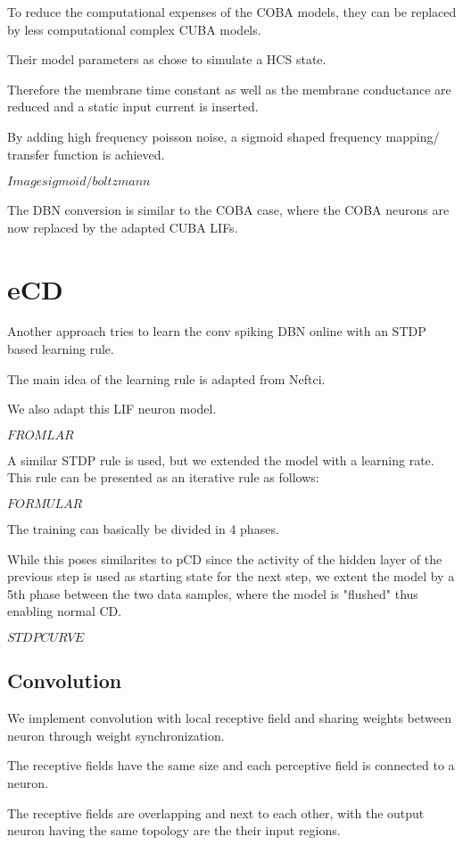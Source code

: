 To reduce the computational expenses of the COBA models, they can be replaced by less computational complex CUBA models.

Their model parameters as chose to simulate a HCS state.

Therefore the membrane time constant as well as the membrane conductance are reduced and a static input current is inserted.  

By adding high frequency poisson noise, a sigmoid shaped frequency mapping/ transfer function is achieved.

$Image sigmoid/ boltzmann$

The DBN conversion is similar to the COBA case, where the COBA neurons are now replaced by the adapted CUBA LIFs.

\section{eCD}

Another approach tries to learn the conv spiking DBN online with an STDP based learning rule. 

The main idea of the learning rule is adapted from Neftci.

We also adapt this LIF neuron model.

$FROMLAR$

A similar STDP rule is used, but we extended the model with a learning rate. 
This rule can be presented as an iterative rule as follows:

$FORMULAR$

The training can basically be divided in 4 phases. 

While this poses similarites to pCD since the activity of the hidden layer of the previous step is used as starting state for the next step, we extent the model by a 5th phase between the two data samples, where the model is "flushed" thus enabling normal CD.

$STDP CURVE$

\subsection{Convolution}

We implement convolution with local receptive field and sharing weights between neuron through weight synchronization.

The receptive fields have the same size and each perceptive field is connected to a neuron. 

The receptive fields are overlapping and next to each other, with the output neuron having the same topology are the their input regions. 


